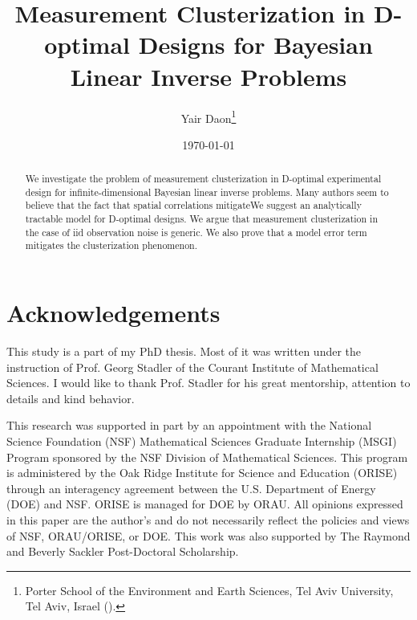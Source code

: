 \documentclass{siamonline220329}
\title{Measurement Clusterization in D-optimal Designs for Bayesian Linear
  Inverse Problems}
\author{Yair Daon\thanks{Porter School of the Environment and Earth
    Sciences, Tel Aviv University, Tel Aviv, Israel
    (\email{yair.daon@gmail.com}).}}
\date{\today}
\begin{document}
\maketitle
\begin{abstract}
  We investigate the problem of measurement clusterization in D-optimal
  experimental design for infinite-dimensional Bayesian linear inverse
  problems. Many authors seem to believe that the fact that spatial
  correlations mitigateWe suggest an analytically tractable model for D-optimal
  designs. We argue that measurement clusterization in the case of iid
  observation noise is generic. We also prove that a model error term
  mitigates the clusterization phenomenon.

\end{abstract}

\maketitle










\section{Acknowledgements}
This study is a part of my PhD thesis. Most of it was written under
the instruction of Prof. Georg Stadler of the Courant Institute of
Mathematical Sciences. I would like to thank Prof. Stadler for his
great mentorship, attention to details and kind behavior.

This research was supported in part by an appointment with the
National Science Foundation (NSF) Mathematical Sciences Graduate
Internship (MSGI) Program sponsored by the NSF Division of
Mathematical Sciences. This program is administered by the Oak Ridge
Institute for Science and Education (ORISE) through an interagency
agreement between the U.S. Department of Energy (DOE) and NSF. ORISE
is managed for DOE by ORAU. All opinions expressed in this paper are
the author's and do not necessarily reflect the policies and views of
NSF, ORAU/ORISE, or DOE.  This work was also supported by The Raymond
and Beverly Sackler Post-Doctoral Scholarship.





\end{document}
